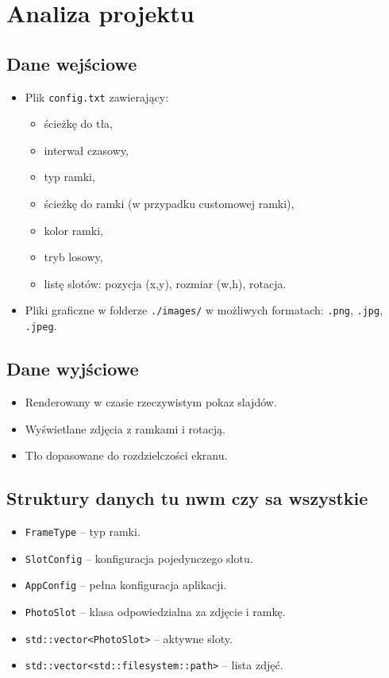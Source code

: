 \documentclass[12pt]{article}
\begin{document}
\section{Analiza projektu}

\subsection{Dane wejściowe}
\begin{itemize}
    \item Plik \texttt{config.txt} zawierający:
    \begin{itemize}
        \item ścieżkę do tła,
        \item interwał czasowy,
        \item typ ramki,
        \item ścieżkę do ramki (w przypadku customowej ramki),
        \item kolor ramki,
        \item tryb losowy,
        \item listę slotów: pozycja (x,y), rozmiar (w,h), rotacja.
    \end{itemize}
    \item Pliki graficzne w folderze \texttt{./images/} w możliwych formatach: \texttt{.png}, \texttt{.jpg}, \texttt{.jpeg}.
\end{itemize}

\subsection{Dane wyjściowe}
\begin{itemize}
    \item Renderowany w czasie rzeczywistym pokaz slajdów.
    \item Wyświetlane zdjęcia z ramkami i rotacją.
    \item Tło dopasowane do rozdzielczości ekranu.
\end{itemize}

\subsection{Struktury danych tu nwm czy sa wszystkie}
\begin{itemize}
    \item \texttt{FrameType} – typ ramki.
    \item \texttt{SlotConfig} – konfiguracja pojedynczego slotu.
    \item \texttt{AppConfig} – pełna konfiguracja aplikacji.
    \item \texttt{PhotoSlot} – klasa odpowiedzialna za zdjęcie i ramkę.
    \item \texttt{std::vector<PhotoSlot>} – aktywne sloty.
    \item \texttt{std::vector<std::filesystem::path>} – lista zdjęć.
\end{itemize}
\end{document}
